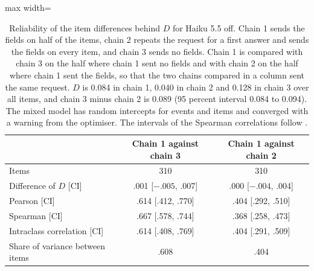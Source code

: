 \begin{table}[h]
\centering
\footnotesize
\setlength{\tabcolsep}{3pt}
\begin{adjustbox}{max width=\linewidth}
\begin{tabular}{lcc}
\toprule
& Chain 1 against chain 3 & Chain 1 against chain 2 \\
\midrule
Items & 310 & 310 \\
Difference of $D$ [CI] & .001 [$-.005$, .007] & .000 [$-.004$, .004] \\
Pearson [CI] & .614 [.412, .770] & .404 [.292, .510] \\
Spearman [CI] & .667 [.578, .744] & .368 [.258, .473] \\
Intraclass correlation [CI] & .614 [.408, .769] & .404 [.291, .509] \\
Share of variance between items & .608 & .404 \\
\bottomrule
\end{tabular}
\end{adjustbox}
\caption{Reliability of the item differences behind $D$ for Haiku 5.5 off. Chain 1 sends the fields on half of the items, chain 2 repeats the request for a first answer and sends the fields on every item, and chain 3 sends no fields. Chain 1 is compared with chain 3 on the half where chain 1 sent no fields and with chain 2 on the half where chain 1 sent the fields, so that the two chains compared in a column sent the same request. $D$ is 0.084 in chain 1, 0.040 in chain 2 and 0.128 in chain 3 over all items, and chain 3 minus chain 2 is 0.089 (95 percent interval 0.084 to 0.094). The mixed model has random intercepts for events and items and converged with a warning from the optimiser. The intervals of the Spearman correlations follow \citet{bonett2000}.}
\label{tab:reliability}
\end{table}
